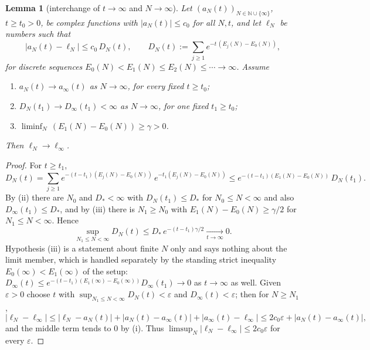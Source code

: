 \documentclass[11pt,a4paper]{article}
\theoremstyle{plain}
\newtheorem{lemma}[theorem]{Lemma}
\theoremstyle{definition}
\newcommand{\eps}{\varepsilon}
\begin{document}
\begin{lemma}[interchange of $t\to\infty$ and $N\to\infty$]\label{lem:interchange}
Let $(a_N(t))_{N\in\mathbb N\cup\{\infty\}}$, $t\ge t_0>0$, be complex functions with
$|a_N(t)|\le c_0$ for all $N,t$, and let $\ell_N$ be numbers such that
\begin{equation}
 |a_N(t)-\ell_N|\le c_0\,D_N(t),\qquad
 D_N(t):=\sum_{j\ge1}e^{-t\,(E_j(N)-E_0(N))},
 \label{eq:tail}
\end{equation}
for discrete sequences $E_0(N)<E_1(N)\le E_2(N)\le\cdots\to\infty$. Assume
\begin{enumerate}
\item[\rm(i)] $a_N(t)\to a_\infty(t)$ as $N\to\infty$, for every fixed $t\ge t_0$;
\item[\rm(ii)] $D_N(t_1)\to D_\infty(t_1)<\infty$ as $N\to\infty$, for one fixed
$t_1\ge t_0$;
\item[\rm(iii)] $\liminf_N\,(E_1(N)-E_0(N))\ge\gamma>0$.
\end{enumerate}
Then $\ell_N\to\ell_\infty$.
\end{lemma}

\begin{proof}
For $t\ge t_1$,
\[
 D_N(t)=\sum_{j\ge1}e^{-(t-t_1)(E_j(N)-E_0(N))}\,e^{-t_1(E_j(N)-E_0(N))}
 \le e^{-(t-t_1)(E_1(N)-E_0(N))}\,D_N(t_1).
\]
By (ii) there are $N_0$ and $D_*<\infty$ with $D_N(t_1)\le D_*$ for
$N_0\le N<\infty$ and also $D_\infty(t_1)\le D_*$, and by (iii) there is
$N_1\ge N_0$ with $E_1(N)-E_0(N)\ge\gamma/2$ for $N_1\le N<\infty$. Hence
\[
 \sup_{N_1\le N<\infty}D_N(t)\le D_*\,e^{-(t-t_1)\gamma/2}
 \xrightarrow[t\to\infty]{}0 .
\]
Hypothesis (iii) is a statement about finite $N$ only and says nothing about
the limit member, which is handled separately by the standing strict
inequality $E_0(\infty)<E_1(\infty)$ of the setup:
$D_\infty(t)\le e^{-(t-t_1)(E_1(\infty)-E_0(\infty))}D_\infty(t_1)\to0$ as
$t\to\infty$ as well.
Given $\eps>0$ choose $t$ with $\sup_{N_1\le N<\infty}D_N(t)<\eps$ and
$D_\infty(t)<\eps$; then for $N\ge N_1$,
\[
 |\ell_N-\ell_\infty|
 \le|\ell_N-a_N(t)|+|a_N(t)-a_\infty(t)|+|a_\infty(t)-\ell_\infty|
 \le 2c_0\eps+|a_N(t)-a_\infty(t)| ,
\]
and the middle term tends to $0$ by (i). Thus
$\limsup_N|\ell_N-\ell_\infty|\le2c_0\eps$ for every $\eps$.
\end{proof}
\end{document}
